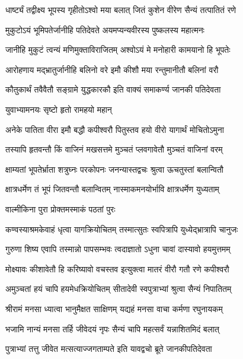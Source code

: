 \twolineshloka
{धार्ष्ट्यं तद्वीक्ष्य भूपस्य गृहीतोऽश्वो मया बलात्}
{जितं कुशेन वीरेण सैन्यं तत्पातितं रणे}%

\twolineshloka
{मुकुटोऽयं भूमिपतेर्जानीहि पतिदेवते}
{अयमप्यन्यवीरस्य पुष्कलस्य महात्मनः}%

\twolineshloka
{जानीहि मुकुटं त्वन्यं मणिमुक्ताविराजितम्}
{अश्वोऽयं मे मनोहारी कामयानो हि भूपतेः}%

\twolineshloka
{आरोहणाय मद्भ्रातुर्जानीहि बलिनो वरे}
{इमौ कीशौ मया रन्तुमानीतौ बलिनां वरौ}%

\twolineshloka
{कौतुकार्थं तवैवैतौ सङ्ग्रामे युद्धकारकौ}
{इति वाक्यं समाकर्ण्य जानकी पतिदेवता}%



\onelineshloka
{युवाभ्यामनयः सृष्टो हृतो रामहयो महान्}%

\twolineshloka
{अनेके पातिता वीरा इमौ बद्धौ कपीश्वरौ}
{पितुस्तव हयो वीरो यागार्थं मोचितोऽमुना}%

\twolineshloka
{तस्यापि हृतवन्तौ किं वाजिनं मखसत्तमे}
{मुञ्चतं प्लवगावेतौ मुञ्चतं वाजिनां वरम्}%

\twolineshloka
{क्षाम्यतां भूपतेर्भ्राता शत्रुघ्नः परकोपनः}
{जनन्यास्तद्वचः श्रुत्वा ऊचतुस्तां बलान्वितौ}%

\twolineshloka
{क्षात्रधर्मेण तं भूपं जितवन्तौ बलान्वितम्}
{नास्माकमनयोर्भावि क्षात्रधर्मेण युध्यताम्}%

\onelineshloka
{वाल्मीकिना पुरा प्रोक्तमस्माकं पठतां पुरः}%

\twolineshloka
{कण्वस्याश्रमकेवाहं धृत्वा यागक्रियोचितम्}
{तस्मात्सुतः स्वपित्रापि युध्येद्भ्रात्रापि चानुजः}%

\twolineshloka
{गुरुणा शिष्य एवापि तस्मान्नो पापसम्भवः}
{त्वदाज्ञातो ऽधुना चावां दास्यावो हयमुत्तमम्}%

\twolineshloka
{मोक्ष्यावः कीशावेतौ हि करिष्यावो वचस्तव}
{इत्युक्त्वा मातरं वीरौ गतौ रणे कपीश्वरौ}%

\twolineshloka
{अमुञ्चतां हयं चापि हयमेधक्रियोचितम्}
{सीतादेवी स्वपुत्राभ्यां श्रुत्वा सैन्यं निपातितम्}%

\twolineshloka
{श्रीरामं मनसा ध्यात्वा भानुमैक्षत साक्षिणम्}
{यद्यहं मनसा वाचा कर्मणा रघुनायकम्}%

\twolineshloka
{भजामि नान्यं मनसा तर्हि जीवेदयं नृपः}
{सैन्यं चापि महत्सर्वं यन्नाशितमिदं बलात्}%

\twolineshloka
{पुत्राभ्यां तत्तु जीवेत मत्सत्याज्जगताम्पते}
{इति यावद्वचो ब्रूते जानकीपतिदेवता}%

